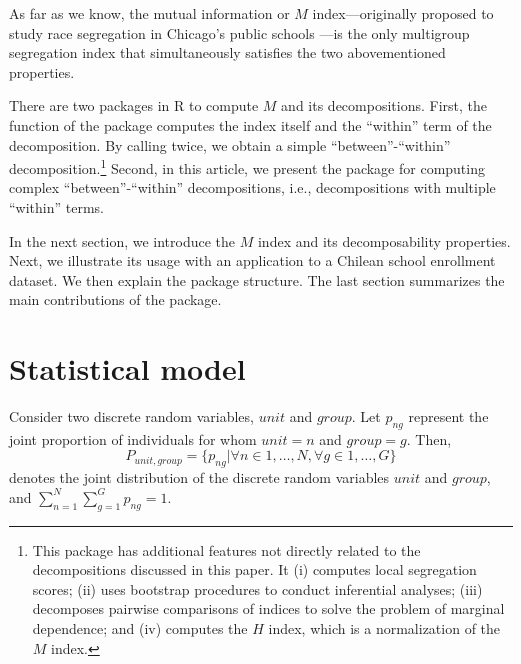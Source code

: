As far as we know, the mutual information or $M$ index---originally proposed to study race segregation in Chicago's public schools \citep{theil_finizza_1971}---is the only multigroup segregation index that simultaneously satisfies the two abovementioned properties.

There are two packages in R to compute $M$ and its decompositions. First, the  function of the  package \citep{segregation-package} computes the index itself and the ``within'' term of the decomposition. By calling  twice, we obtain a simple ``between''-``within''  decomposition.\footnote{This package has additional features not directly related to the decompositions discussed in this paper. It (i) computes local segregation scores; (ii) uses bootstrap procedures to conduct inferential analyses; (iii) decomposes pairwise comparisons of indices to solve the problem of marginal dependence; and (iv) computes the $H$ index, which is a normalization of the $M$ index.} Second, in this article, we present the  package \citep{mutualinf-package} for computing complex ``between''-``within'' decompositions, i.e., decompositions with multiple ``within'' terms.

In the next section, we introduce the $M$ index and its decomposability properties. Next, we illustrate its usage with an application to a Chilean school enrollment dataset. We then explain the package structure. The last section summarizes the main contributions of the  package.

\section{Statistical model}
Consider two discrete random variables, $unit$ and $group$. Let $p_{ng}$ represent the joint proportion of individuals for whom $unit=n$ and $group=g$. Then, 
\begin{equation}
P_{unit, group} = \{p_{ng}| \forall n \in 1,\ldots,N, \forall g \in 1,\ldots,G\} \label{eq: joint}
\end{equation}
denotes the joint distribution of the discrete random variables $unit$ and $group$, and $\sum_{n=1}^{N} \sum_{g=1}^{G} p_{ng} = 1$. 

